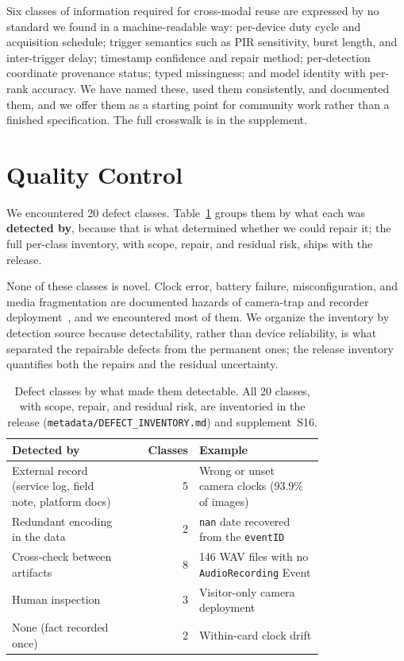 \documentclass[sigconf]{acmart}
\begin{document}
Six classes of information required for cross-modal reuse are
expressed by no standard we found in a machine-readable way: per-device
duty cycle and acquisition schedule; trigger semantics such as PIR
sensitivity, burst length, and inter-trigger delay; timestamp confidence
and repair method; per-detection coordinate provenance status; typed
missingness; and model identity with per-rank accuracy. We have named
these, used them consistently, and documented them, and we offer them as
a starting point for community work rather than a finished
specification. The full crosswalk is in the supplement.

\section{Quality Control}
\label{sec:qc}

We encountered 20 defect classes. Table~\ref{tab:defects} groups them
by what each was \textbf{detected by}, because that is what determined
whether we could repair it; the full per-class inventory, with scope,
repair, and residual risk, ships with the release.

None of these classes is novel. Clock error, battery failure,
misconfiguration, and media fragmentation are documented hazards of
camera-trap and recorder
deployment~\cite{lahozmonfort2021monitoring,ahumada2020wildlifeinsights,Pestell2025SmartCamera},
and we encountered most of them. We organize the inventory by detection
source because detectability, rather than device reliability, is what
separated the repairable defects from the permanent ones; the release
inventory quantifies both the repairs and the residual uncertainty.

\begin{table}[t]
\caption{Defect classes by what made them detectable. All 20 classes,
with scope, repair, and residual risk, are inventoried in the release
(\texttt{metadata/DEFECT\_INVENTORY.md}) and supplement~S16.}
\label{tab:defects}
\small
\begin{tabular}{p{0.38\linewidth}rp{0.40\linewidth}}
\toprule
\textbf{Detected by} & \textbf{Classes} & \textbf{Example} \\
\midrule
External record (service log, field note, platform docs) & 5 & Wrong or unset camera clocks (93.9\% of images) \\
Redundant encoding in the data & 2 & \texttt{nan} date recovered from the \texttt{eventID} \\
Cross-check between artifacts & 8 & 146 WAV files with no \texttt{AudioRecording} Event \\
Human inspection & 3 & Visitor-only camera deployment \\
\midrule
None (fact recorded once) & 2 & Within-card clock drift \\
\bottomrule
\end{tabular}
\end{table}
\end{document}
